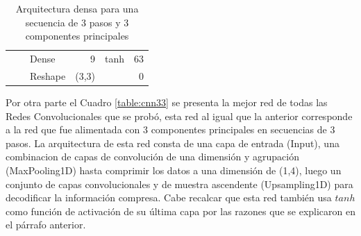 \begin{table}[H]
\begin{center}
\begin{tabular}{ll|l|r|l|r|}
\multicolumn{1}{|l|}{}                              &                             & Dense                              & 9                                    & tanh                                     & 63                                          \\ \cline{3-6} 
\multicolumn{1}{|l|}{}                              &                             & Reshape                            & (3,3)                                &                                          & 0                                           \\ \hline
\end{tabular}
\end{center}
\caption{Arquitectura densa para una secuencia de 3 pasos y 3 componentes principales}
\label{table:dense33}
\end{table}





Por otra parte el Cuadro \ref{table:cnn33} se presenta la mejor red de todas las Redes Convolucionales que se prob\'{o}, esta red al igual que la anterior corresponde a la red que fue alimentada con 3 componentes principales en secuencias de 3 pasos. La arquitectura de esta red consta de una capa de entrada (Input), una combinacion de capas de convoluci\'{o}n de una dimensi\'{o}n y agrupaci\'{o}n (MaxPooling1D) hasta comprimir los datos a una dimensi\'{o}n de (1,4), luego un conjunto de capas convolucionales y de muestra ascendente (Upsampling1D) para decodificar la informaci\'{o}n compresa. Cabe recalcar que esta red tambi\'{e}n usa $tanh$ como funci\'{o}n de activaci\'{o}n de su \'{u}ltima capa por las razones que se explicaron en el p\'{a}rrafo anterior.

